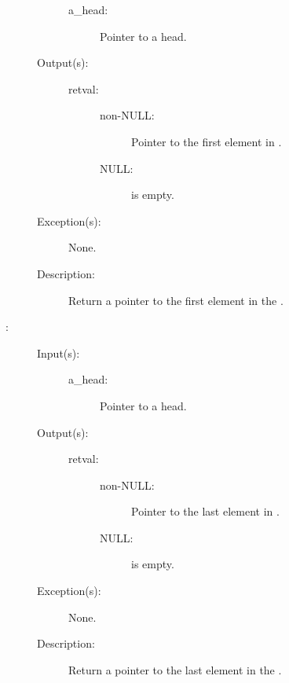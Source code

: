 \begin{description}
\begin{description}
		\begin{description}\item[]
		\item[a\_head: ]
			Pointer to a  head.
		\end{description}
	\item[Output(s): ]
		\begin{description}\item[]
		\item[retval: ]
			\begin{description}\item[]
			\item[non-NULL: ]
				Pointer to the first element in .
			\item[NULL: ]
				 is empty.
			\end{description}
		\end{description}
	\item[Exception(s): ] None.
	\item[Description: ]
		Return a pointer to the first element in the .
	\end{description}
\label{ql_last}
\item[{\cppmacro[{\lt}ql\_type{\gt} *]{ql\_last}{{\lt}ql\_head{\gt}
*a\_head}}: ]
	\begin{description}\item[]
	\item[Input(s): ]
		\begin{description}\item[]
		\item[a\_head: ]
			Pointer to a  head.
		\end{description}
	\item[Output(s): ]
		\begin{description}\item[]
		\item[retval: ]
			\begin{description}\item[]
			\item[non-NULL: ]
				Pointer to the last element in .
			\item[NULL: ]
				 is empty.
			\end{description}
		\end{description}
	\item[Exception(s): ] None.
	\item[Description: ]
		Return a pointer to the last element in the .

\end{description}
\end{description}
